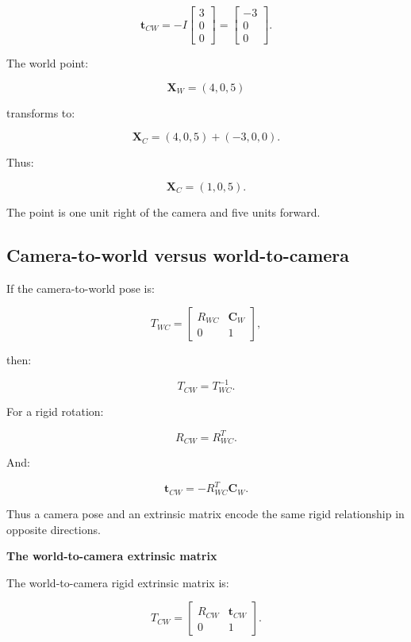 \[
 \mathbf t_{CW}= -I \begin{bmatrix}3\\0\\0\end{bmatrix} = \begin{bmatrix}-3\\0\\0\end{bmatrix}.
\]

The world point:

\[
 \mathbf X_W=(4,0,5)
\]

transforms to:

\[
 \mathbf X_C= (4,0,5)+(-3,0,0).
\]

Thus:

\[
 \boxed{ \mathbf X_C=(1,0,5) }.
\]

The point is one unit right of the camera and five units forward.

\subsection{Camera-to-world versus world-to-camera}\label{02-foundations-ii-ch035-camera-to-world-versus-world-to-camera}

\hypertarget{02-foundations-ii-ch035-camera-to-world-versus-world-to-camera}{}

If the camera-to-world pose is:

\[
 T_{WC}= \begin{bmatrix} R_{WC}&\mathbf C_W\\ 0&1 \end{bmatrix},
\]

then:

\[
 \boxed{ T_{CW}=T_{WC}^{-1} }.
\]

For a rigid rotation:

\[
 R_{CW}=R_{WC}^T.
\]

And:

\[
 \boxed{ \mathbf t_{CW}=-R_{WC}^T\mathbf C_W }.
\]

Thus a camera pose and an extrinsic matrix encode the same rigid relationship in opposite directions.

\textbf{The world-to-camera extrinsic matrix}

The world-to-camera rigid extrinsic matrix is:

\[
 \boxed{ T_{CW}= \begin{bmatrix} R_{CW}&\mathbf t_{CW}\\ 0&1 \end{bmatrix} }.
\]

